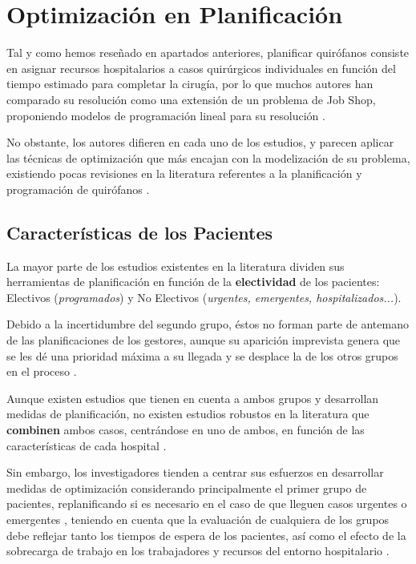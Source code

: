 \newpage
\section{Optimización en Planificación}

Tal y como hemos reseñado en apartados anteriores, planificar quirófanos consiste en asignar recursos hospitalarios a casos quirúrgicos individuales en función del tiempo estimado para completar la cirugía, por lo que muchos autores han comparado su resolución como una extensión de un problema de Job Shop, proponiendo modelos de programación lineal para su resolución \cite{Pham2008SurgicalProblem}.

No obstante, los autores difieren en cada uno de los estudios, y parecen aplicar las técnicas de optimización que más encajan con la modelización de su problema, existiendo pocas revisiones en la literatura referentes a la planificación y programación de quirófanos \cite{Gur2018ApplicationOverview}. 

\subsection{Características de los Pacientes}

La mayor parte de los estudios existentes en la literatura dividen sus herramientas de planificación en función de la \textbf{electividad} de los pacientes: Electivos (\textit{programados}) y No Electivos (\textit{urgentes, emergentes, hospitalizados...}).

Debido a la incertidumbre del segundo grupo, éstos no forman parte de antemano de las planificaciones de los gestores, aunque su aparición imprevista genera que se les dé una prioridad máxima a su llegada y se desplace la de los otros grupos en el proceso \cite{CAYIRLI2009OUTPATIENTLITERATURE} .

Aunque existen estudios que tienen en cuenta a ambos grupos y desarrollan medidas de planificación, no existen estudios robustos en la literatura que \textbf{combinen} ambos casos, centrándose en uno de ambos, en función de las características de cada hospital \cite{Gur2018ApplicationOverview}.

Sin embargo, los investigadores tienden a centrar sus esfuerzos en desarrollar medidas de optimización considerando principalmente el primer grupo de pacientes, replanificando si es necesario en el caso de que lleguen casos urgentes o emergentes \cite{Nouaouri2011OperatingDisaster}, teniendo en cuenta que la evaluación de cualquiera de los grupos debe reflejar tanto los tiempos de espera de los pacientes, así como el efecto de la sobrecarga de trabajo en los trabajadores y recursos del entorno hospitalario \cite{Gur2018ApplicationOverview}.

